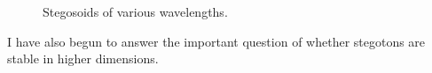 \begin{figure}
\caption{Stegosoids of various wavelengths. \label{fig:stegosoid}}
\end{figure}

I have also begun to answer the important question of whether stegotons
are stable in higher dimensions.
